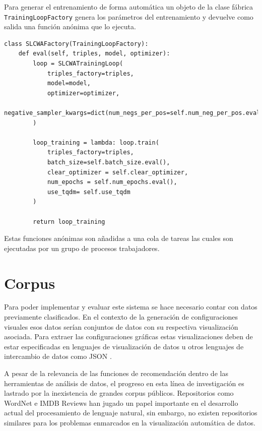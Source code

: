 Para generar el entrenamiento de forma autom\'atica un objeto de la clase
f\'abrica \texttt{TrainingLoopFactory} genera los par\'ametros del
entrenamiento y devuelve como salida una funci\'on an\'onima que lo ejecuta.

\label{code:auto-kge-traning}
\begin{lstlisting}[caption=Generaci\'on autom\'atica de entrenamiento de KGE, label = code:auto-kge-trainig]
class SLCWAFactory(TrainingLoopFactory):
    def eval(self, triples, model, optimizer):
        loop = SLCWATrainingLoop(
            triples_factory=triples,
            model=model,
            optimizer=optimizer,
            negative_sampler_kwargs=dict(num_negs_per_pos=self.num_neg_per_pos.eval())
        )

        loop_training = lambda: loop.train(
            triples_factory=triples,
            batch_size=self.batch_size.eval(),
            clear_optimizer = self.clear_optimizer,
            num_epochs = self.num_epochs.eval(),
            use_tqdm= self.use_tqdm
        )

        return loop_training
\end{lstlisting}

Estas funciones an\'onimas son a\~nadidas a una cola
de tareas las cuales son ejecutadas por un grupo
de procesos trabajadores.

\section{Corpus}

Para poder implementar y evaluar este sistema se hace necesario contar con datos previamente clasificados.
En el contexto de la generaci\'on de configuraciones visuales esos datos ser\'ian conjuntos
de datos con su respectiva visualizaci\'on asociada. Para extraer las configuraciones gr\'aficas
estas visualizaciones deben de estar especificadas en lenguajes de visualizaci\'on de datos u otros lenguajes
de intercambio de datos como JSON \cite{pezoa2016foundations}.

A pesar de la relevancia de las funciones de recomendaci\'on dentro
de las herramientas de an\'alisis de datos, el progreso en esta l\'inea
de investigaci\'on es lastrado por la inexistencia de grandes corpus p\'ublicos.
Repositorios como WordNet \cite{wordnet1998} e IMDB Reviews \cite{maas-EtAl:2011:ACL-HLT2011} han jugado un papel importante en el desarrollo actual
del procesamiento de lenguaje natural, sin embargo, no existen repositorios similares para
los problemas enmarcados en la visualizaci\'on autom\'atica de datos.

